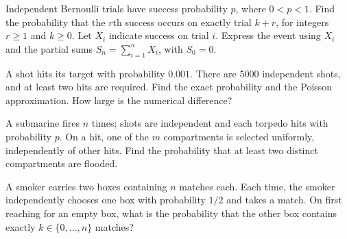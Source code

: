 \documentclass[11pt,a4paper]{article}
\newcounter{problem}[section]
\begin{document}
\begin{problem}
Independent Bernoulli trials have success probability $p$, where $0<p<1$.
Find the probability that the $r$th success occurs on exactly trial $k+r$, for
integers $r\ge1$ and $k\ge0$. Let $X_i$ indicate success on trial $i$. Express
the event using $X_i$ and the partial sums $S_n=\sum_{i=1}^nX_i$, with $S_0=0$.
\end{problem}
\begin{problem}
A shot hits its target with probability $0.001$. There are 5000 independent shots,
and at least two hits are required. Find the exact probability and the Poisson
approximation. How large is the numerical difference?
\end{problem}
\begin{problem}
A submarine fires $n$ times; shots are independent and each torpedo hits with
probability $p$. On a hit, one of the $m$ compartments is selected uniformly,
independently of other hits. Find the probability that at least two distinct compartments are flooded.
\end{problem}
\begin{problem}
A smoker carries two boxes containing $n$ matches each. Each time, the smoker
independently chooses one box with probability $1/2$ and takes a match.
On first reaching for an empty box, what is the probability that the other box
contains exactly $k\in\{0,\dots,n\}$ matches?
\end{problem}
\end{document}
